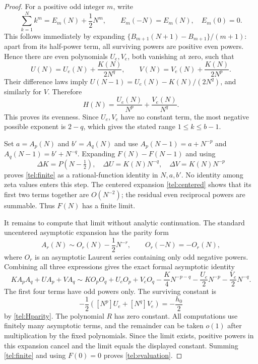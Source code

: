 \begin{proof}
For a positive odd integer $m$, write
\[
 \sum_{k=1}^N k^m=E_m(N)+\frac12N^m,
 \qquad E_m(-N)=E_m(N),\quad E_m(0)=0.
\]
This follows immediately by expanding
$\{B_{m+1}(N+1)-B_{m+1}\}/(m+1)$: apart from its half-power term,
all surviving powers are positive even powers. Hence there are even
polynomials $U_e,V_e$, both vanishing at zero, such that
\[
 U(N)=U_e(N)+\frac{K(N)}{2N^q},\qquad
 V(N)=V_e(N)+\frac{K(N)}{2N^p}.
\]
Their difference laws imply
$U(N-1)=U_e(N)-K(N)/(2N^q)$, and similarly for $V$.
Therefore
\begin{equation}\label{tel:Hparity}
 H(N)=\frac{U_e(N)}{N^p}+\frac{V_e(N)}{N^q}.
\end{equation}
This proves its evenness. Since $U_e,V_e$ have no constant term, the
most negative possible exponent is $2-q$, which gives the stated range
$1\le k\le b-1$.

Set $a=A_p(N)$ and $b'=A_q(N)$ and use
$A_p(N-1)=a+N^{-p}$ and $A_q(N-1)=b'+N^{-q}$.
Expanding $F(N)-F(N-1)$ and using
\[
 \Delta K=P(N-\tfrac12),\quad
 \Delta U=K(N)N^{-q},\quad \Delta V=K(N)N^{-p}
\]
proves \eqref{tel:finite} as a rational-function identity in
$N,a,b'$. No identity among zeta values enters this step.
The centered expansion \eqref{tel:centered} shows that its first
two terms together are $O(N^{-2})$; the residual even reciprocal
powers are summable. Thus $F(N)$ has a finite limit.

It remains to compute that limit without analytic continuation.
The standard uncentered asymptotic expansion has the parity form
\[
 A_r(N)\sim O_r(N)-\frac12N^{-r},
 \qquad O_r(-N)=-O_r(N),
\]
where $O_r$ is an asymptotic Laurent series containing only odd
negative powers. Combining all three expressions gives the exact
formal asymptotic identity
\[
 KA_pA_q+UA_p+VA_q\sim
 KO_pO_q+U_eO_p+V_eO_q-\frac K4N^{-p-q}
   -\frac{U_e}{2}N^{-p}-\frac{V_e}{2}N^{-q}.
\]
The first four terms have odd powers only. The surviving constant is
\[
 -\frac12\left([N^p]U_e+[N^q]V_e\right)=-\frac{h_0}{2}
\]
by \eqref{tel:Hparity}. The polynomial $R$ has zero constant.
All computations use finitely many asymptotic terms, and the remainder
can be taken $o(1)$ after multiplication by the fixed polynomials.
Since the limit exists, positive powers in this expansion cancel and
the limit equals the displayed constant. Summing \eqref{tel:finite}
and using $F(0)=0$ proves \eqref{tel:evaluation}.
\end{proof}

